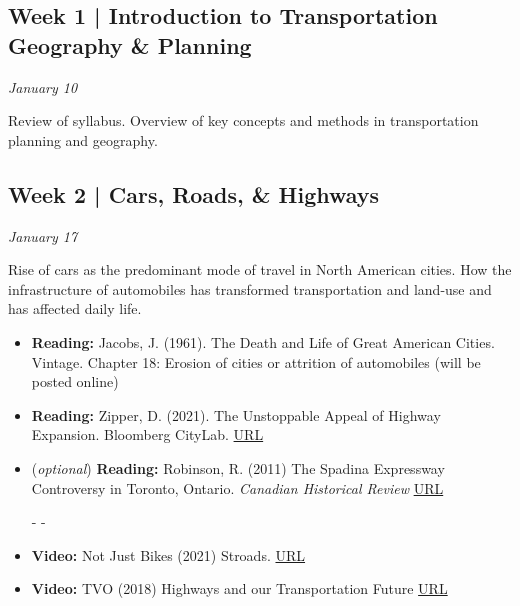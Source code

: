 \documentclass[11pt]{article}
\begin{document}
	
	\subsection*{Week 1 | Introduction to Transportation Geography \& Planning}
	
	\textit{January 10}

	Review of syllabus. Overview of key concepts and methods in transportation planning and geography. 
	
	
	

	
		
	
	\subsection*{Week 2 | Cars, Roads, \& Highways}
	
	\textit{January 17}
	
	Rise of cars as the predominant mode of travel in North American cities. How the infrastructure of automobiles has transformed transportation and land-use and has affected daily life. 
	
	\begin{itemize}
		
		\item \textbf{Reading:} Jacobs, J. (1961). The Death and Life of Great American Cities. Vintage.
		Chapter 18: Erosion of cities or attrition of automobiles (will be posted online)
					
		
		\item \textbf{Reading:} Zipper, D. (2021). The Unstoppable Appeal of Highway Expansion. Bloomberg CityLab. \href{https://www.bloomberg.com/news/features/2021-09-28/why-widening-highways-doesn-t-bring-traffic-relief}{URL}
		
		\item (\textit{optional}) \textbf{Reading:} Robinson, R. (2011) The Spadina Expressway Controversy in Toronto, Ontario. \textit{ Canadian Historical Review} \href{https://www.utpjournals.press/doi/pdf/10.3138/chr.92.2.295}{URL}
		
		- -
		
		\item \textbf{Video:} Not Just Bikes (2021) Stroads. \href{https://www.youtube.com/watch?v=ORzNZUeUHAM}{URL}
		
		\item \textbf{Video:} TVO (2018) 
		Highways and our Transportation Future \href{https://www.tvo.org/video/highways-and-our-transportation-future}{URL}
		
		
	\end{itemize}
\end{document}
